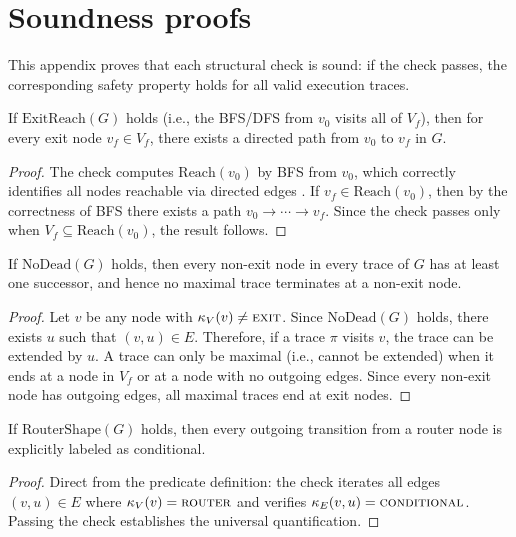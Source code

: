 \section{Soundness proofs}
\label{app:proofs}

This appendix proves that each structural check is sound: if the check passes, the
corresponding safety property holds for all valid execution traces.

\begin{lemma}
\label{lem:exit_reach}
If $\mathrm{ExitReach}(G)$ holds (i.e., the BFS/DFS from $v_0$ visits
all of $V_f$), then for every exit node $v_f \in V_f$, there exists a
directed path from $v_0$ to $v_f$ in $G$.
\end{lemma}
\begin{proof}
The check computes $\mathrm{Reach}(v_0)$ by BFS from $v_0$, which
correctly identifies all nodes reachable via directed edges
\citep{clarke1999modelchecking}. If $v_f \in \mathrm{Reach}(v_0)$,
then by the correctness of BFS there exists a path $v_0 \to \cdots \to
v_f$. Since the check passes only when $V_f \subseteq
\mathrm{Reach}(v_0)$, the result follows.
\end{proof}

\begin{lemma}
\label{lem:dead_end}
If $\mathrm{NoDead}(G)$ holds, then every non-exit node in every trace
of $G$ has at least one successor, and hence no maximal trace terminates
at a non-exit node.
\end{lemma}
\begin{proof}
Let $v$ be any node with $\kappa_V(v) \neq \textsc{exit}$. Since
$\mathrm{NoDead}(G)$ holds, there exists $u$ such that $(v,u) \in E$.
Therefore, if a trace $\pi$ visits $v$, the trace can be extended by
$u$. A trace can only be maximal (i.e., cannot be extended) when it
ends at a node in $V_f$ or at a node with no outgoing edges. Since
every non-exit node has outgoing edges, all maximal traces end at exit
nodes.
\end{proof}

\begin{lemma}
\label{lem:router_shape}
If $\mathrm{RouterShape}(G)$ holds, then every outgoing transition from
a router node is explicitly labeled as conditional.
\end{lemma}
\begin{proof}
Direct from the predicate definition: the check iterates all edges
$(v,u) \in E$ where $\kappa_V(v) = \textsc{router}$ and verifies
$\kappa_E(v,u) = \textsc{conditional}$. Passing the check establishes
the universal quantification.
\end{proof}

